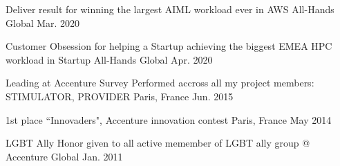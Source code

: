 
\begin{cvhonors}
  \cvhonor
    {Deliver result} %
    {for winning the largest AIML workload ever in AWS All-Hands} %
    {Global} %
    {Mar. 2020} %

  \cvhonor
    {Customer Obsession} %
    {for helping a Startup achieving the biggest EMEA HPC workload in Startup All-Hands} %
    {Global} %
    {Apr. 2020} %

  \cvhonor
    {Leading at Accenture} %
    {Survey Performed accross all my project members: STIMULATOR, PROVIDER} %
    {Paris, France} %
    {Jun. 2015} %

  \cvhonor
    {1st place} %
    {``Innovaders", Accenture innovation contest} %
    {Paris, France} %
    {May 2014} %

  \cvhonor
    {LGBT Ally} %
    {Honor given to all active memember of LGBT ally group @ Accenture} %
    {Global} %
    {Jan. 2011} %

\end{cvhonors}
